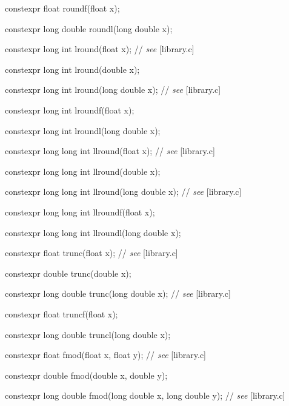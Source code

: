 \documentclass[prd,twocolumn,amsmath,amssymb,nofootinbib,eqsecnum]{revtex4-1}
\newcommand{\oldhighlight}[1]{{\color{blue} #1}}
\newcommand{\stdcomment}[1]{{// {\it see} [#1]}}
\begin{document}
{\oldhighlight{constexpr} float roundf(float x);

\oldhighlight{constexpr} long double roundl(long double x);

\vspace{2ex}


\oldhighlight{constexpr} long int lround(float x); \stdcomment{library.c}

\oldhighlight{constexpr} long int lround(double x);

\oldhighlight{constexpr} long int lround(long double x); \stdcomment{library.c}

\oldhighlight{constexpr} long int lroundf(float x);

\oldhighlight{constexpr} long int lroundl(long double x);

\vspace{2ex}


\oldhighlight{constexpr} long long int llround(float x); \stdcomment{library.c}

\oldhighlight{constexpr} long long int llround(double x);

\oldhighlight{constexpr} long long int llround(long double x); \stdcomment{library.c}

\oldhighlight{constexpr} long long int llroundf(float x);

\oldhighlight{constexpr} long long int llroundl(long double x);

\vspace{2ex}


\oldhighlight{constexpr} float trunc(float x); \stdcomment{library.c}

\oldhighlight{constexpr} double trunc(double x);

\oldhighlight{constexpr} long double trunc(long double x); \stdcomment{library.c}

\oldhighlight{constexpr} float truncf(float x);

\oldhighlight{constexpr} long double truncl(long double x);

\vspace{2ex}


\oldhighlight{constexpr} float fmod(float x, float y); \stdcomment{library.c}

\oldhighlight{constexpr} double fmod(double x, double y);

\oldhighlight{constexpr} long double fmod(long double x, long double y); \stdcomment{library.c}

}
\end{document}
